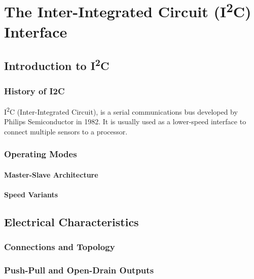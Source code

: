 \documentclass[11pt,fleqn]{book} %
\begin{document}
	
\chapter{The Inter-Integrated Circuit (I\textsuperscript{2}C) Interface}


\section{Introduction to I\textsuperscript{2}C}
\subsection{History of I2C}
I\textsuperscript{2}C (Inter-Integrated Circuit), is a serial communications bus developed by Philips Semiconductor in 1982. It is usually used as a lower-speed interface to connect multiple sensors to a processor. 

\subsection{Operating Modes}
\subsubsection{Master-Slave Architecture}
\subsubsection{Speed Variants}

\section{Electrical Characteristics}
\subsection{Connections and Topology}
\subsection{Push-Pull and Open-Drain Outputs}
\end{document}
